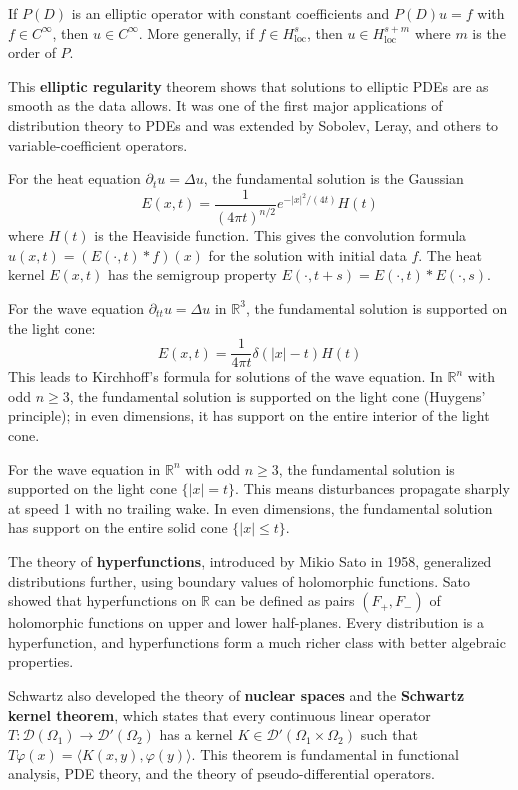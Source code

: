 \begin{theorem}
If $P(D)$ is an elliptic operator with constant coefficients and $P(D)u = f$ with $f \in C^\infty$, then $u \in C^\infty$. More generally, if $f \in H^s_{\text{loc}}$, then $u \in H^{s+m}_{\text{loc}}$ where $m$ is the order of $P$.
\end{theorem}

This \textbf{elliptic regularity} theorem shows that solutions to elliptic PDEs are as smooth as the data allows. It was one of the first major applications of distribution theory to PDEs and was extended by Sobolev, Leray, and others to variable-coefficient operators.

For the heat equation $\partial_t u = \Delta u$, the fundamental solution is the Gaussian
\[E(x,t) = \frac{1}{(4\pi t)^{n/2}} e^{-|x|^2/(4t)} H(t)\]
where $H(t)$ is the Heaviside function. This gives the convolution formula $u(x,t) = (E(\cdot,t) * f)(x)$ for the solution with initial data $f$. The heat kernel $E(x,t)$ has the semigroup property $E(\cdot, t+s) = E(\cdot, t) * E(\cdot, s)$.

For the wave equation $\partial_{tt} u = \Delta u$ in $\mathbb{R}^3$, the fundamental solution is supported on the light cone:
\[E(x,t) = \frac{1}{4\pi t} \delta(|x| - t) H(t)\]
This leads to Kirchhoff's formula for solutions of the wave equation. In $\mathbb{R}^n$ with odd $n \geq 3$, the fundamental solution is supported on the light cone (Huygens' principle); in even dimensions, it has support on the entire interior of the light cone.

\begin{theorem}
For the wave equation in $\mathbb{R}^n$ with odd $n \geq 3$, the fundamental solution is supported on the light cone $\{|x| = t\}$. This means disturbances propagate sharply at speed 1 with no trailing wake. In even dimensions, the fundamental solution has support on the entire solid cone $\{|x| \leq t\}$.
\end{theorem}

The theory of \textbf{hyperfunctions}, introduced by Mikio Sato in 1958, generalized distributions further, using boundary values of holomorphic functions. Sato showed that hyperfunctions on $\mathbb{R}$ can be defined as pairs $(F_+, F_-)$ of holomorphic functions on upper and lower half-planes. Every distribution is a hyperfunction, and hyperfunctions form a much richer class with better algebraic properties.

Schwartz also developed the theory of \textbf{nuclear spaces} and the \textbf{Schwartz kernel theorem}, which states that every continuous linear operator $T: \mathcal{D}(\Omega_1) \to \mathcal{D}'(\Omega_2)$ has a kernel $K \in \mathcal{D}'(\Omega_1 \times \Omega_2)$ such that $T\varphi(x) = \langle K(x,y), \varphi(y) \rangle$. This theorem is fundamental in functional analysis, PDE theory, and the theory of pseudo-differential operators.


